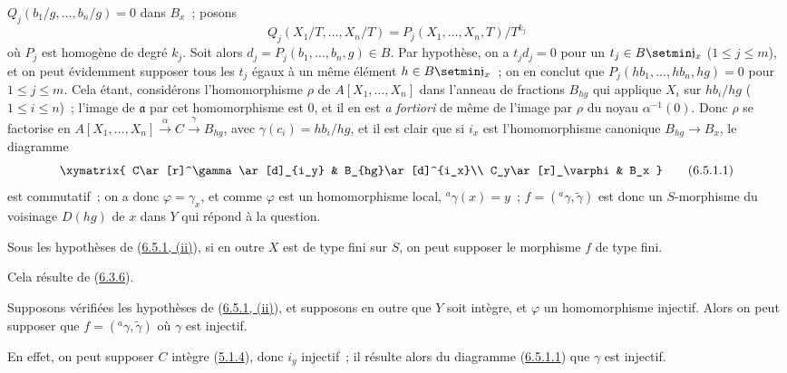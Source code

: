 \begin{enumerate}
    $Q_j(b_1/g,\ldots,b_n/g)=0$ dans $B_x$~; posons
    \[
      Q_j(X_1/T,\ldots,X_n/T)
      =P_j(X_1,\ldots,X_n,T)/T^{k_j}
    \]
    où $P_j$ est homogène de degré $k_j$. Soit alors
    $d_j=P_j(b_1,\ldots,b_n,g)\in B$. Par hypothèse, on a $t_jd_j=0$ pour un
    $t_j\in B\setmin\mathfrak{j}_x$ ($1\leq j\leq m$), et on peut évidemment
    supposer tous les $t_j$
    égaux à un même élément $h\in B\setmin\mathfrak{j}_x$~; on en conclut que
    $P_j(hb_1,\ldots,hb_n,hg)=0$ pour $1\leq j\leq m$. Cela étant, considérons
    l'homomorphisme $\rho$ de $A[X_1,\ldots,X_n]$ dans l'anneau de fractions
    $B_{hg}$ qui applique $X_i$ sur $hb_i/hg$ ($1\leq i\leq n$)~; l'image de
    $\mathfrak{a}$ par cet homomorphisme est 0, et il en est \emph{a fortiori}
    de même de l'image par $\rho$ du noyau $\alpha^{-1}(0)$. Donc $\rho$ se
    factorise en
    $A[X_1,\ldots,X_n]\xrightarrow{\alpha}C\xrightarrow{\gamma}B_{hg}$, avec
    $\gamma(c_i)=hb_i/hg$, et il est clair que si $i_x$ est l'homomorphisme
    canonique $B_{hg}\to B_x$, le diagramme
    \[
      \xymatrix{
        C\ar[r]^\gamma\ar[d]_{i_y} & B_{hg}\ar[d]^{i_x}\\
        C_y\ar[r]_\varphi & B_x
      }
      \tag{6.5.1.1}\label{I.6.5.1.1-fr}
    \]
    est commutatif~; on a donc $\varphi=\gamma_x$, et comme $\varphi$ est un
    homomorphisme local, ${}^a\gamma(x)=y$~; $f=({}^a\gamma,\widetilde{\gamma})$
    est donc un $S$-morphisme du voisinage $D(hg)$ de $x$ dans $Y$ qui répond à
    la question.
\end{enumerate}

\begin{corollary}[6.5.2]
\label{I.6.5.2-fr}
Sous les hypothèses de \textup{(\hyperref[I.6.5.1-fr]{6.5.1, (ii)})}, si en outre $X$
est de type fini sur $S$, on peut supposer le morphisme $f$ de type fini.
\end{corollary}

Cela résulte de (\hyperref[I.6.3.6-fr]{6.3.6}).

\begin{corollary}[6.5.3]
\label{I.6.5.3-fr}
Supposons vérifiées les hypothèses de
\textup{(\hyperref[I.6.5.1-fr]{6.5.1, (ii)})}, et supposons en outre que $Y$ soit
intègre, et $\varphi$ un homomorphisme injectif. Alors on peut supposer que
$f=({}^a\gamma,\widetilde{\gamma})$ où $\gamma$ est injectif.
\end{corollary}

En effet, on peut supposer $C$ intègre
(\hyperref[I.5.1.4-fr]{5.1.4}), donc $i_y$ injectif~; il résulte alors du
diagramme (\hyperref[I.6.5.1.1-fr]{6.5.1.1}) que $\gamma$ est injectif.

